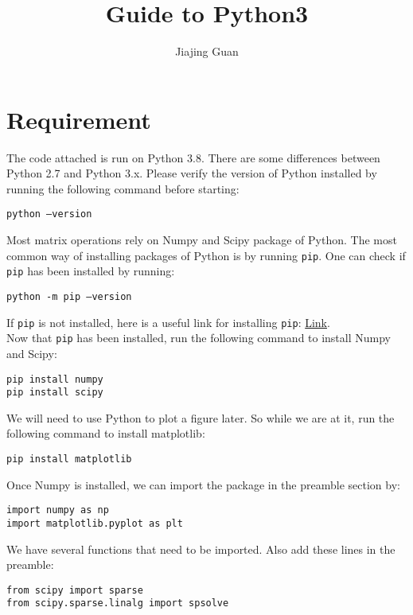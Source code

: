 \documentclass{article}
\title{Guide to Python3}
\author{Jiajing Guan}
\begin{document}
\maketitle

\section{Requirement}
The code attached is run on Python 3.8. There are some differences between Python 2.7 and Python 3.x. Please verify the version of Python installed by running the following command before starting:
\begin{center}
\texttt{python --version}
\end{center}

Most matrix operations rely on Numpy and Scipy package of Python. The most common way of installing packages of Python is by running \texttt{pip}. One can check if \texttt{pip} has been installed by running:
\begin{center}
\texttt{python -m pip --version}
\end{center}

If \texttt{pip} is not installed, here is a useful link for installing \texttt{pip}: \href{https://pip.pypa.io/en/stable/installing/}{Link}. \\

Now that \texttt{pip} has been installed, run the following command to install Numpy and Scipy:
\begin{center}
\texttt{pip install numpy}\\
\texttt{pip install scipy}
\end{center}

We will need to use Python to plot a figure later. So while we are at it, run the following command to install matplotlib:
\begin{center}
\texttt{pip install matplotlib}
\end{center}

Once Numpy is installed, we can import the package in the preamble section by:
\begin{center}
\texttt{import numpy as np}\\
\texttt{import matplotlib.pyplot as plt }
\end{center}

We have several functions that need to be imported. Also add these lines in the preamble:
\begin{center}
\texttt{from scipy import sparse}\\
\texttt{from scipy.sparse.linalg import spsolve}
\end{center}
\end{document}

